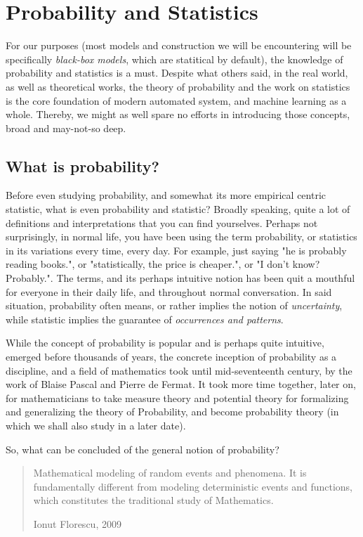 \chapter{Probability and Statistics}
For our purposes (most models and construction we will be encountering will be specifically \textit{black-box models}, which are statitical by default), the knowledge of probability and statistics is a must. Despite what others said, in the real world, as well as theoretical works, the theory of probability and the work on statistics is the core foundation of modern automated system, and machine learning as a whole. Thereby, we might as well spare no efforts in introducing those concepts, broad and may-not-so deep.

\section{What is probability?}

Before even studying probability, and somewhat its more empirical centric statistic, what is even probability and statistic? Broadly speaking, quite a lot of definitions and interpretations that you can find yourselves. Perhaps not surprisingly, in normal life, you have been using the term probability, or statistics in its variations every time, every day. For example, just saying "he is probably reading books.", or "statistically, the price is cheaper.", or "I don't know? Probably.". The terms, and its perhaps intuitive notion has been quit a mouthful for everyone in their daily life, and throughout normal conversation. In said situation, probability often means, or rather implies the notion of \textit{uncertainty}, while statistic implies the guarantee of \textit{occurrences and patterns}. 

While the concept of probability is popular and is perhaps quite intuitive, emerged before thousands of years, the concrete inception of probability as a discipline, and a field of mathematics took until mid-seventeenth century, by the work of Blaise Pascal and Pierre de Fermat. It took more time together, later on, for mathematicians to take measure theory and potential theory for formalizing and generalizing the theory of Probability, and become probability theory (in which we shall also study in a later date). 

So, what can be concluded of the general notion of probability? 

\blockquote[Ionut Florescu, 2009]{Mathematical modeling of random events and phenomena. It is fundamentally different from modeling deterministic events and functions, which constitutes the traditional study of Mathematics.}

